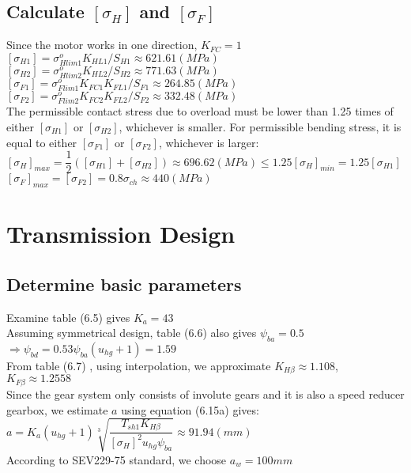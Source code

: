 \subsection{Calculate $ [\sigma_H] $ and $ [\sigma_F] $}
Since the motor works in one direction, $ K_{FC} = 1$\\
$ [\sigma_{H1}] = \sigma_{Hlim1}^oK_{HL1}/S_{H1} \approx 621.61\unit{(MPa)}$\\
$ [\sigma_{H2}] = \sigma_{Hlim2}^oK_{HL2}/S_{H2} \approx 771.63\unit{(MPa)}$\\
$ [\sigma_{F1}] = \sigma_{Flim1}^oK_{FC1}K_{FL1}/S_{F1} \approx 264.85\unit{(MPa)}$\\
$ [\sigma_{F2}] = \sigma_{Flim2}^oK_{FC2}K_{FL2}/S_{F2} \approx 332.48\unit{(MPa)}$\\
The permissible contact stress due to overload must be lower than 1.25 times of either $ [\sigma_{H1}] $ or $ [\sigma_{H2}] $, whichever is smaller. For permissible bending stress, it is equal to either $ [\sigma_{F1}] $ or $ [\sigma_{F2}] $, whichever is larger:\\
$ [\sigma_H]_{max} = \dfrac{1}{2}\left( [\sigma_{H1}]+[\sigma_{H2}]\right)  \approx 696.62\unit{(MPa)}\leq 1.25[\sigma_H]_{min} = 1.25[\sigma_{H1}]$\\
$ [\sigma_F]_{max} = [\sigma_{F2}] = 0.8\sigma_{ch} \approx 440\unit{(MPa)} $
\section{Transmission Design}
\subsection{Determine basic parameters}
Examine table (6.5)  gives $ K_a = 43 $\\
Assuming symmetrical design, table (6.6)  also gives $ \psi_{ba} = 0.5$\\
$ \Rightarrow \psi_{bd} = 0.53\psi_{ba}(u_{hg}+1) = 1.59$\\
From table (6.7) , using interpolation, we approximate $ K_{H\beta} \approx 1.108 $, $ K_{F\beta} \approx 1.2558 $\\
Since the gear system only consists of involute gears and it is also a speed reducer gearbox, we estimate $ a $ using equation (6.15a) gives:\\
$ a = K_a(u_{hg}+1)\sqrt[3]{\dfrac{T_{sh1}K_{H\beta}}{[\sigma_H]^2u_{hg}\psi_{ba}}} \approx 91.94 \unit{(mm)}$\\
According to SEV229-75 standard, we choose $ a_w = 100 \unit{mm}$
